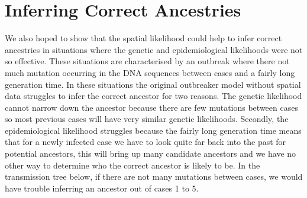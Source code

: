 \documentclass[11pt,a4paper]{report}
\begin{document}
\section{Inferring Correct Ancestries}
We also hoped to show that the spatial likelihood could help to infer correct ancestries in situations where the genetic and epidemiological likelihoods were not so effective. These situations are characterised by an outbreak where there not much mutation occurring in the DNA sequences between cases and a fairly long generation time. In these situations the original outbreaker model without spatial data struggles to infer the correct ancestor for two reasons. The genetic likelihood cannot narrow down the ancestor because there are few mutations between cases so most previous cases will have very similar genetic likelihoods. Secondly, the epidemiological likelihood struggles because the fairly long generation time means that for a newly infected case we have to look quite far back into the past for potential ancestors, this will bring up many candidate ancestors and we have no other way to determine who the correct ancestor is likely to be. In the transmission tree below, if there are not many mutations between cases, we would have trouble inferring an ancestor out of cases 1 to 5.
\\
\begin{center}
\end{center}	
\end{document}
